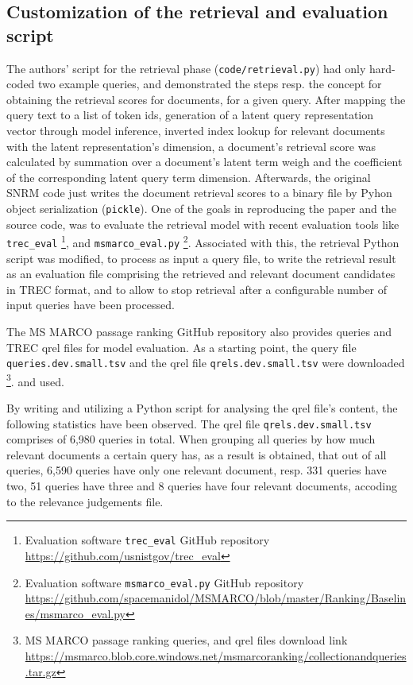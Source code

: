 \subsection{Customization of the retrieval and evaluation script}
The authors' script for the retrieval phase (\texttt{code/retrieval.py}) had only hard-coded two example queries,
    and demonstrated the steps resp. the concept for obtaining the retrieval scores for documents, for a given query.
After mapping the query text to a list of token ids, generation of a latent query representation vector through model inference, 
    inverted index lookup for relevant documents with the latent representation's dimension, a document's retrieval score was
    calculated by summation over a document's latent term weigh and the coefficient of the corresponding latent query term dimension.
Afterwards, the original SNRM code just writes the document retrieval scores to a binary file by Pyhon object 
    serialization (\texttt{pickle}).
One of the goals in reproducing the paper and the source code, was to evaluate the retrieval model with recent evaluation tools like 
    \verb|trec_eval| \footnote{Evaluation software \texttt{trec\_eval} GitHub repository \url{https://github.com/usnistgov/trec_eval}},
    and \verb|msmarco_eval.py| 
    \footnote{Evaluation software \texttt{msmarco\_eval.py} GitHub repository \url{https://github.com/spacemanidol/MSMARCO/blob/master/Ranking/Baselines/msmarco_eval.py}}.
Associated with this, the retrieval Python script was modified, to process as input a query file, to write the retrieval result as an 
    evaluation file comprising the retrieved and relevant document candidates in TREC format, 
    and to allow to stop retrieval after a configurable number of input queries have been processed. 

The MS MARCO passage ranking GitHub repository also provides queries and TREC qrel files for model evaluation.
As a starting point, the query file \texttt{queries.dev.small.tsv} and the qrel file \texttt{qrels.dev.small.tsv} were downloaded
    \footnote{MS MARCO passage ranking queries, and qrel files download link \url{https://msmarco.blob.core.windows.net/msmarcoranking/collectionandqueries.tar.gz} }.
    and used.

By writing and utilizing a Python script for analysing the qrel file's content, the following statistics have been observed.
The qrel file \texttt{qrels.dev.small.tsv} comprises of 6,980 queries in total.
When grouping all queries by how much relevant documents a certain query has, as a result is obtained, that 
    out of all queries, 6,590 queries have only one relevant document, resp. 331 queries have two, 
    51 queries have three and 8 queries have four relevant documents, accoding to the relevance judgements file.

